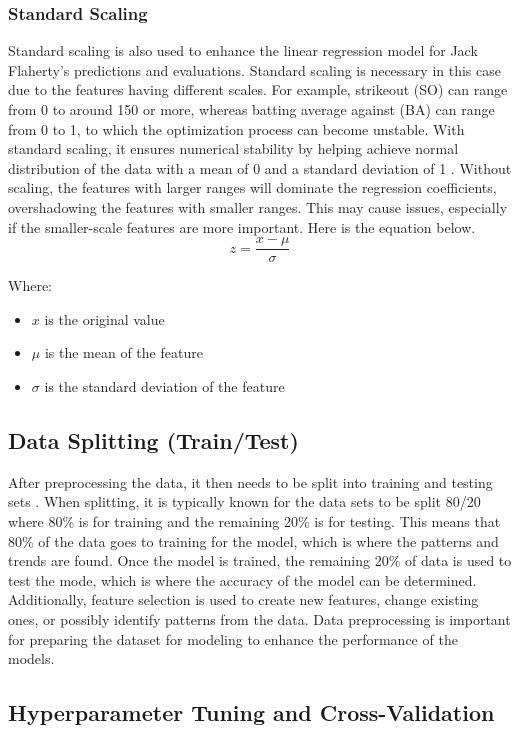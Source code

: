 \documentclass[10pt,twocolumn]{article}
\begin{document}
\subsubsection{Standard Scaling}
Standard scaling is also used to enhance the linear regression model for Jack Flaherty’s predictions and evaluations. Standard scaling is necessary in this case due to the features having different scales. For example, strikeout (SO) can range from 0 to around 150 or more, whereas batting average against (BA) can range from 0 to 1, to which the optimization process can become unstable. With standard scaling, it ensures numerical stability by helping achieve normal distribution of the data with a mean of 0 and a standard deviation of 1 \cite{16}. Without scaling, the features with larger ranges will dominate the regression coefficients, overshadowing the features with smaller ranges. This may cause issues, especially if the smaller-scale features are more important. Here is the equation below. 
\[
z = \frac{x - \mu}{\sigma}
\]

Where:
\begin{itemize}
    \item $x$ is the original value
    \item $\mu$ is the mean of the feature
    \item $\sigma$ is the standard deviation of the feature
\end{itemize}

\subsection{Data Splitting (Train/Test)}

After preprocessing the data, it then needs to be split into training and testing sets \cite{17}. When splitting, it is typically known for the data sets to be split 80/20 where 80\% is for training and the remaining 20\% is for testing. This means that 80\% of the data goes to training for the model, which is where the patterns and trends are found. Once the model is trained, the remaining 20\% of data is used to test the mode, which is where the accuracy of the model can be determined. Additionally, feature selection is used to create new features, change existing ones, or possibly identify patterns from the data. Data preprocessing is important for preparing the dataset for modeling to enhance the performance of the models. 

\subsection{Hyperparameter Tuning and Cross-Validation}
\end{document}
